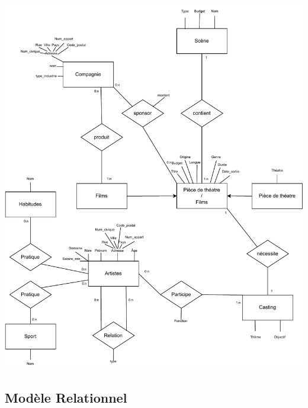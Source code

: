 \documentclass{article}
\begin{document}
\begin{center}
  \includegraphics[scale=0.9]{modeleEA.pdf}
\end{center}
  
\newpage

\subsection{Modèle Relationnel}
\end{document}
